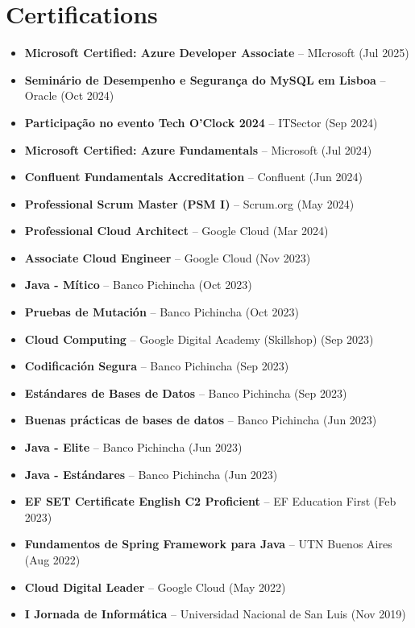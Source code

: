 \documentclass[10pt, letterpaper]{article}
\begin{document}
\section{Certifications}
\begin{itemize}[leftmargin=10pt, noitemsep]
    \item \textbf{Microsoft Certified: Azure Developer Associate} – MIcrosoft (Jul 2025)
    \item \textbf{Seminário de Desempenho e Segurança do MySQL em Lisboa} – Oracle (Oct 2024)
    \item \textbf{Participação no evento Tech O'Clock 2024} – ITSector (Sep 2024)
    \item \textbf{Microsoft Certified: Azure Fundamentals} – Microsoft (Jul 2024)
    \item \textbf{Confluent Fundamentals Accreditation} – Confluent (Jun 2024)
    \item \textbf{Professional Scrum Master (PSM I)} – Scrum.org (May 2024)
    \item \textbf{Professional Cloud Architect} – Google Cloud (Mar 2024)
    \item \textbf{Associate Cloud Engineer} – Google Cloud (Nov 2023)
    \item \textbf{Java - Mítico} – Banco Pichincha (Oct 2023)
    \item \textbf{Pruebas de Mutación} – Banco Pichincha (Oct 2023)
    \item \textbf{Cloud Computing} – Google Digital Academy (Skillshop) (Sep 2023)
    \item \textbf{Codificación Segura} – Banco Pichincha (Sep 2023)
    \item \textbf{Estándares de Bases de Datos} – Banco Pichincha (Sep 2023)
    \item \textbf{Buenas prácticas de bases de datos} – Banco Pichincha (Jun 2023)
    \item \textbf{Java - Elite} – Banco Pichincha (Jun 2023)
    \item \textbf{Java - Estándares} – Banco Pichincha (Jun 2023)
    \item \textbf{EF SET Certificate English C2 Proficient} – EF Education First (Feb 2023)
    \item \textbf{Fundamentos de Spring Framework para Java} – UTN Buenos Aires (Aug 2022)
    \item \textbf{Cloud Digital Leader} – Google Cloud (May 2022)
    \item \textbf{I Jornada de Informática} – Universidad Nacional de San Luis (Nov 2019)
\end{itemize}
\end{document}
